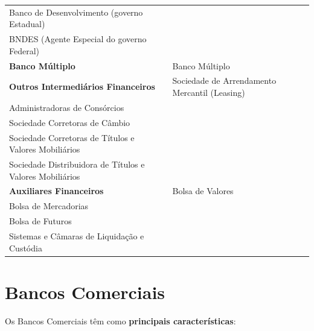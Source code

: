 \documentclass{article}\usepackage[]{graphicx}\usepackage[]{xcolor}
\begin{document}
\begin{table}[H]
{\begin{tabular}{ |p{2cm}|p{2cm}|  }
 \multicolumn{1}{|l|}{Banco de Desenvolvimento (governo Estadual)}              & \multicolumn{1}{l|}{}\\
 \multicolumn{1}{|l|}{BNDES (Agente Especial do governo Federal)}               & \multicolumn{1}{l|}{}\\
 \hline
 \multicolumn{1}{|l|}{\textbf{Banco Múltiplo}}                                & \multicolumn{1}{l|}{Banco Múltiplo}\\
 \hline
 \multicolumn{1}{|l|}{\textbf{Outros Intermediários Financeiros}} & \multicolumn{1}{l|}{Sociedade de Arrendamento Mercantil (Leasing)}\\
 \multicolumn{1}{|l|}{Administradoras de Consórcios}                            & \multicolumn{1}{l|}{}\\
 \multicolumn{1}{|l|}{Sociedade Corretoras de Câmbio}                           & \multicolumn{1}{l|}{}\\
 \multicolumn{1}{|l|}{Sociedade Corretoras de Títulos e Valores Mobiliários}    & \multicolumn{1}{l|}{}\\
 \multicolumn{1}{|l|}{Sociedade Distribuidora de Títulos e Valores Mobiliários} & \multicolumn{1}{l|}{}\\
 \multicolumn{1}{|l|}{\textbf{Auxiliares Financeiros}}                          & \multicolumn{1}{l|}{Bolsa de Valores}\\
 \multicolumn{1}{|l|}{Bolsa de Mercadorias}                                     & \multicolumn{1}{l|}{}\\
 \multicolumn{1}{|l|}{Bolsa de Futuros}                                         & \multicolumn{1}{l|}{}\\
 \multicolumn{1}{|l|}{Sistemas e Câmaras de Liquidação e Custódia}              & \multicolumn{1}{l|}{}\\
 \hline
\end{tabular}}
\end{table}

\section*{Bancos Comerciais}

Os Bancos Comerciais têm como \textbf{principais características}:
\end{document}
